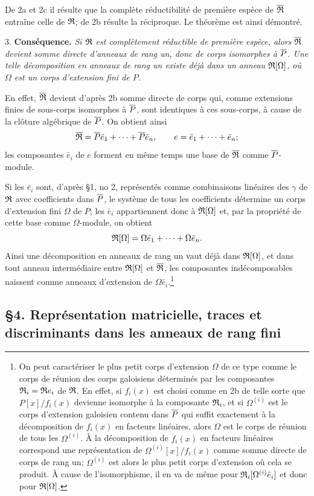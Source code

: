 De 2a et 2c il résulte que la complète réductibilité de première espèce de $\overline{\mathfrak R}$ entraîne celle de $\mathfrak R$; de 2b résulte la réciproque. Le théorème est ainsi démontré.

3. \textbf{Conséquence.} \emph{Si $\mathfrak R$ est complètement réductible de première espèce, alors $\overline{\mathfrak R}$ devient somme directe d'anneaux de rang un, donc de corps isomorphes à $\overline P$. Une telle décomposition en anneaux de rang un existe déjà dans un anneau $\mathfrak R[\Omega]$, où $\Omega$ est un corps d'extension fini de $P$.}

En effet, $\overline{\mathfrak R}$ devient d'après 2b somme directe de corps qui, comme extensions finies de sous-corps isomorphes à $\overline P$, sont identiques à ces sous-corps, à cause de la clôture algébrique de $\overline P$. On obtient ainsi
\[
        \overline{\mathfrak R}=\overline P\bar e_1+\cdots+\overline P\bar e_n,
        \qquad e=\bar e_1+\cdots+\bar e_n;
\]
les composantes $\bar e_i$ de $e$ forment en même temps une base de $\overline{\mathfrak R}$ comme $\overline P$-module.

Si les $\bar e_i$ sont, d'après \S 1, no 2, représentés comme combinaisons linéaires des $\gamma$ de $\mathfrak R$ avec coefficients dans $\overline P$, le système de tous les coefficients détermine un corps d'extension fini $\Omega$ de $P$; les $\bar e_i$ appartiennent donc à $\mathfrak R[\Omega]$ et, par la propriété de cette base comme $\Omega$-module, on obtient
\[
        \mathfrak R[\Omega]=\Omega\bar e_1+\cdots+\Omega\bar e_n.
\]
Ainsi une décomposition en anneaux de rang un vaut déjà dans $\mathfrak R[\Omega]$, et dans tout anneau intermédiaire entre $\mathfrak R[\Omega]$ et $\overline{\mathfrak R}$, les composantes indécomposables naissent comme anneaux d'extension de $\Omega\bar e_i$.\footnote{On peut caractériser le plus petit corps d'extension $\Omega$ de ce type comme le corps de réunion des corps galoisiens déterminés par les composantes $\mathfrak R_i=\mathfrak R e_i$ de $\mathfrak R$. En effet, si $f_i(x)$ est choisi comme en 2b de telle sorte que $P[x]/f_i(x)$ devienne isomorphe à la composante $\mathfrak R_i$, et si $\Omega^{(i)}$ est le corps d'extension galoisien contenu dans $\overline P$ qui suffit exactement à la décomposition de $f_i(x)$ en facteurs linéaires, alors $\Omega$ est le corps de réunion de tous les $\Omega^{(i)}$. À la décomposition de $f_i(x)$ en facteurs linéaires correspond une représentation de $\Omega^{(i)}[x]/f_i(x)$ comme somme directe de corps de rang un; $\Omega^{(i)}$ est alors le plus petit corps d'extension où cela se produit. À cause de l'isomorphisme, il en va de même pour $\mathfrak R_i[\Omega^{(i)}\bar e_i]$ et donc pour $\mathfrak R[\Omega]$.}

\subsection*{\S 4. Représentation matricielle, traces et discriminants dans les anneaux de rang fini}

